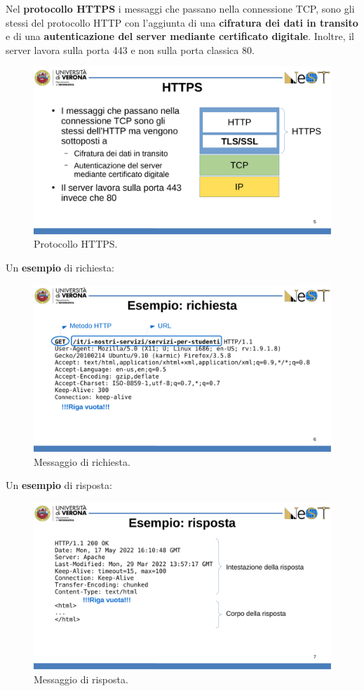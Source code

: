 \documentclass[a4paper]{article}
\begin{document}
	\noindent
	Nel \textcolor{Red3}{\textbf{protocollo HTTPS}} i messaggi che passano nella connessione TCP, sono gli stessi del protocollo HTTP con l'aggiunta di una \textbf{cifratura dei dati in transito} e di una \textbf{autenticazione del server mediante certificato digitale}. Inoltre, il server lavora sulla porta 443 e non sulla porta classica 80.
	\begin{figure}[!htp]
		\centering
		\includegraphics[width=.4\textwidth]{img/protocollo_https.pdf}
		\caption{Protocollo HTTPS.}
	\end{figure}

	\noindent
	Un \textcolor{Green4}{\textbf{esempio}} di richiesta:
	\begin{figure}[!htp]
		\centering
		\includegraphics[width=\textwidth]{img/richiesta_http.pdf}
		\caption{Messaggio di richiesta.}
	\end{figure}

	\noindent
	Un \textcolor{Green4}{\textbf{esempio}} di risposta:
	\begin{figure}[!htp]
		\centering
		\includegraphics[width=\textwidth]{img/risposta_http.pdf}
		\caption{Messaggio di risposta.}
	\end{figure}\newpage
\end{document}
